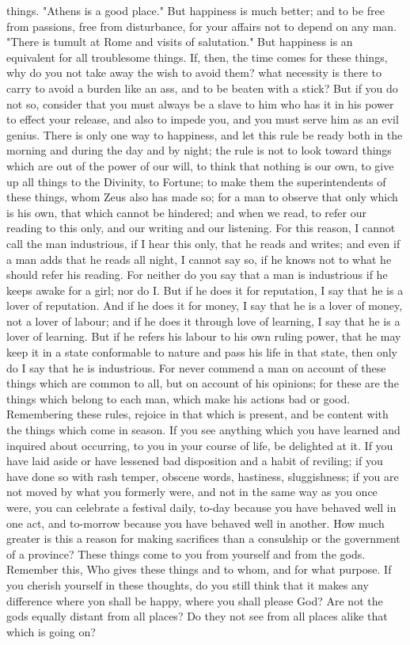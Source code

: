 \documentclass[a4paper]{article}
\begin{document}
things. "Athens is a good place." But happiness is much better; and to be free
from passions, free from disturbance, for your affairs not to depend on any
man. "There is tumult at Rome and visits of salutation." But happiness is an
equivalent for all troublesome things. If, then, the time comes for these
things, why do you not take away the wish to avoid them? what necessity is
there to carry to avoid a burden like an ass, and to be beaten with a stick?
But if you do not so, consider that you must always be a slave to him who has
it in his power to effect your release, and also to impede you, and you must
serve him as an evil genius.
    There is only one way to happiness, and let this rule be ready both in the
morning and during the day and by night; the rule is not to look toward things
which are out of the power of our will, to think that nothing is our own, to
give up all things to the Divinity, to Fortune; to make them the
superintendents of these things, whom Zeus also has made so; for a man to
observe that only which is his own, that which cannot be hindered; and when we
read, to refer our reading to this only, and our writing and our listening. For
this reason, I cannot call the man industrious, if I hear this only, that he
reads and writes; and even if a man adds that he reads all night, I cannot say
so, if he knows not to what he should refer his reading. For neither do you say
that a man is industrious if he keeps awake for a girl; nor do I. But if he
does it for reputation, I say that he is a lover of reputation. And if he does
it for money, I say that he is a lover of money, not a lover of labour; and if
he does it through love of learning, I say that he is a lover of learning. But
if he refers his labour to his own ruling power, that he may keep it in a state
conformable to nature and pass his life in that state, then only do I say that
he is industrious. For never commend a man on account of these things which are
common to all, but on account of his opinions; for these are the things which
belong to each man, which make his actions bad or good. Remembering these
rules, rejoice in that which is present, and be content with the things which
come in season. If you see anything which you have learned and inquired about
occurring, to you in your course of life, be delighted at it. If you have laid
aside or have lessened bad disposition and a habit of reviling; if you have
done so with rash temper, obscene words, hastiness, sluggishness; if you are
not moved by what you formerly were, and not in the same way as you once were,
you can celebrate a festival daily, to-day because you have behaved well in one
act, and to-morrow because you have behaved well in another. How much greater
is this a reason for making sacrifices than a consulship or the government of a
province? These things come to you from yourself and from the gods. Remember
this, Who gives these things and to whom, and for what purpose. If you cherish
yourself in these thoughts, do you still think that it makes any difference
where yon shall be happy, where you shall please God? Are not the gods equally
distant from all places? Do they not see from all places alike that which is
going on?
\end{document}
